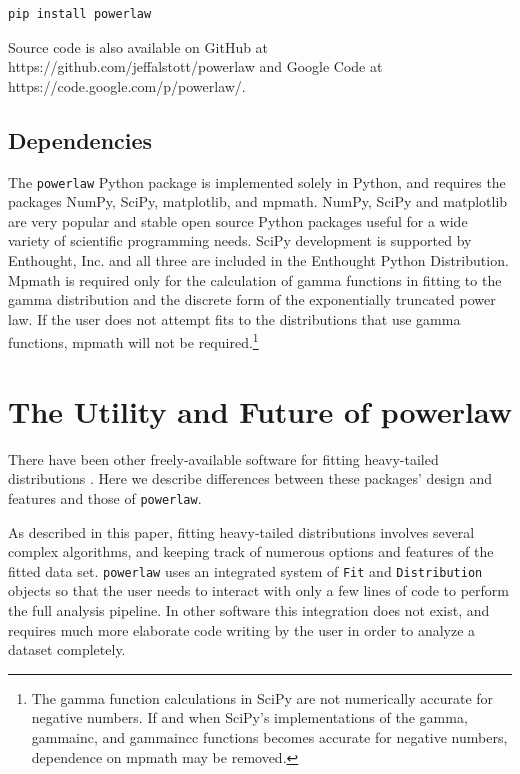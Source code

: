 \documentclass[10pt]{article}
\begin{document}
\begin{verbatim}
pip install powerlaw
\end{verbatim}

Source code is also available on GitHub at https://github.com/jeffalstott/powerlaw and Google Code at https://code.google.com/p/powerlaw/.

\subsection*{Dependencies}
The \verb$powerlaw$ Python package is implemented solely in Python, and requires the packages NumPy, SciPy, matplotlib, and mpmath. NumPy, SciPy and matplotlib are very popular and stable open source Python packages useful for a wide variety of scientific programming needs. SciPy development is supported by Enthought, Inc. and all three are included in the Enthought Python Distribution. Mpmath is required only for the calculation of gamma functions in fitting to the gamma distribution and the discrete form of the exponentially truncated power law. If the user does not attempt fits to the distributions that use gamma functions, mpmath will not be required.\footnote{The gamma function calculations in SciPy are not numerically accurate for negative numbers. If and when SciPy's implementations of the gamma, gammainc, and gammaincc functions becomes accurate for negative numbers, dependence on mpmath may be removed.}

\section*{The Utility and Future of powerlaw}
There have been other freely-available software for fitting heavy-tailed distributions \cite{Clauset2009, Ginsburg2012}. Here we describe differences between these packages' design and features and those of \verb$powerlaw$.


As described in this paper, fitting heavy-tailed distributions involves several complex algorithms, and keeping track of numerous options and features of the fitted data set. \verb$powerlaw$ uses an integrated system of \verb$Fit$ and \verb$Distribution$ objects so that the user needs to interact with only a few lines of code to perform the full analysis pipeline. In other software this integration does not exist, and requires much more elaborate code writing by the user in order to analyze a dataset completely.
\end{document}
